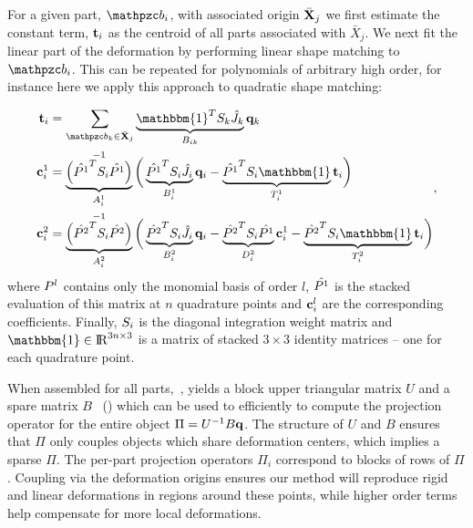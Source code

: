 For a given part, $\prt_i$, with associated origin $\bar{\mathbf{X}}_j$ we first estimate the constant term, $\mathbf{t}_i$ as the centroid of all parts associated with $\bar{X}_j$.
We next fit the linear part of the deformation by performing linear shape matching to $\prt_i$. 
This can be repeated for polynomials of arbitrary high order, for instance here we apply this approach to quadratic shape matching:

\begin{equation}
    \begin{split}
        \tr_i  & = \sum_{\prt_k \in \bar{\refX}_j} \underbrace{\mathbbm{1}^T\wt_k \samp{\Jnurbs}_k}_{B_{ik}}\vc{q}_k \\
        \vc{c}_i^1 & = \underbrace{\left(\samp{\Pmat^1}^T\wt_i\samp{\Pmat^1}\right)}_{A^1_i}^{-1}\bigg(\underbrace{\samp{\Pmat^1}^T\wt_i\samp{\Jnurbs}_i}_{B^1_i}\vc{q}_i-\underbrace{\samp{\Pmat^1}^T\wt_i\mathbbm{1}}_{T^1_i}\tr_i\bigg)\\
        \vc{c}_i^2 & = \underbrace{\left(\samp{\Pmat^2}^T\wt_i\samp{\Pmat^2}\right)}_{A^2_i}^{-1}\bigg(\underbrace{\samp{\Pmat^2}^T\wt_i\samp{\Jnurbs}_i}_{B^2_i}\vc{q}_i-\underbrace{\samp{\Pmat^2}^T\wt_i\samp{\Pmat^1}}_{D^2_i}\vc{c}_i^1 - \underbrace{\samp{\Pmat^2}^T\wt_i\mathbbm{1}}_{T^2_i}\tr_i\bigg)
    \end{split},
    \label{eq:hfit} 
\end{equation} where $P^l$ contains only the monomial basis of order $l$,  $\hat{P^1}$ is the stacked evaluation of this matrix at $n$ quadrature points and $\mathbf{c}^l_i$ are the corresponding coefficients. 
Finally, $S_i$ is the diagonal integration weight matrix and $\mathbbm{1}\in\real^{3n\times3}$ is a matrix of stacked $3\times3$ identity matrices -- one for each quadrature point.


When assembled for all parts,~, yields a block upper triangular matrix $U$ and a spare matrix $B$ ~() which can be used to efficiently to compute the projection 
operator for the entire object $\Pi = U^{-1}B\mathbf{q}$. 
The structure of $U$ and $B$ ensures that $\Pi$ only couples objects which share deformation centers, which implies a sparse $\Pi$. 
The per-part projection operators $\Pi_i$ correspond to blocks of rows of $\Pi$. 
Coupling via the deformation origins ensures our method will reproduce rigid and linear deformations in regions around these points, while higher order 
terms help compensate for more local deformations.


